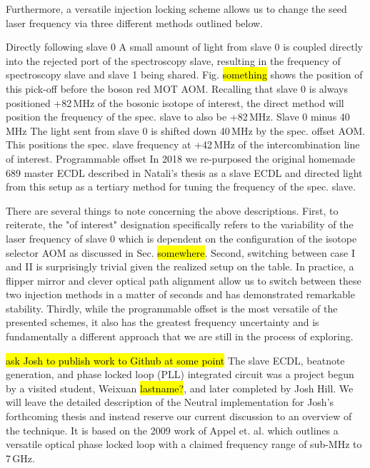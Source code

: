 Furthermore, a versatile injection locking scheme allows us to change the seed laser frequency via three different methods outlined below.
\begin{outline}[enumerate]
	\1 Directly following slave 0
		\2 A small amount of light from slave 0 is coupled directly into the rejected port of the spectroscopy slave, resulting in the frequency of spectroscopy slave and slave 1 being shared. 
		Fig. \hl{something} shows the position of this pick-off before the boson red MOT AOM. 
		Recalling that slave 0 is always positioned +82\,MHz of the bosonic isotope of interest, the direct method will position the frequency of the spec. slave to also be +82\,MHz.
	\1 Slave 0 minus 40\,MHz
		\2 The light sent from slave 0 is shifted down 40\,MHz by the spec. offset AOM. This positions the spec. slave frequency at +42\,MHz of the intercombination line of interest.
	\1 Programmable offset
		\2 In 2018 we re-purposed the original homemade 689 master ECDL described in Natali's thesis as a slave ECDL and directed light from this setup as a tertiary method for tuning the frequency of the spec. slave. 
\end{outline}
There are several things to note concerning the above descriptions.
First, to reiterate, the "of interest" designation specifically refers to the variability of the laser frequency of slave 0 which is dependent on the configuration of the isotope selector AOM as discussed in Sec. \hl{somewhere}.
Second, switching between case I and II is surprisingly trivial given the realized setup on the table.
In practice, a flipper mirror and clever optical path alignment allow us to switch between these two injection methods in a matter of seconds and has demonstrated remarkable stability.
Thirdly, while the programmable offset is the most versatile of the presented schemes, it also has the greatest frequency uncertainty and is fundamentally a different approach that we are still in the process of exploring.

\hl{ask Josh to publish work to Github at some point}
The slave ECDL, beatnote generation, and phase locked loop (PLL) integrated circuit was a project begun by a visited student, Weixuan \hl{lastname?}, and later completed by Josh Hill.
We will leave the detailed description of the Neutral implementation for Josh's forthcoming thesis and instead reserve our current discussion to an overview of the technique.
It is based on the 2009 work of Appel et. al. \cite{zfr08expansion} which outlines a versatile optical phase locked loop with a claimed frequency range of sub-MHz to 7\,GHz.

